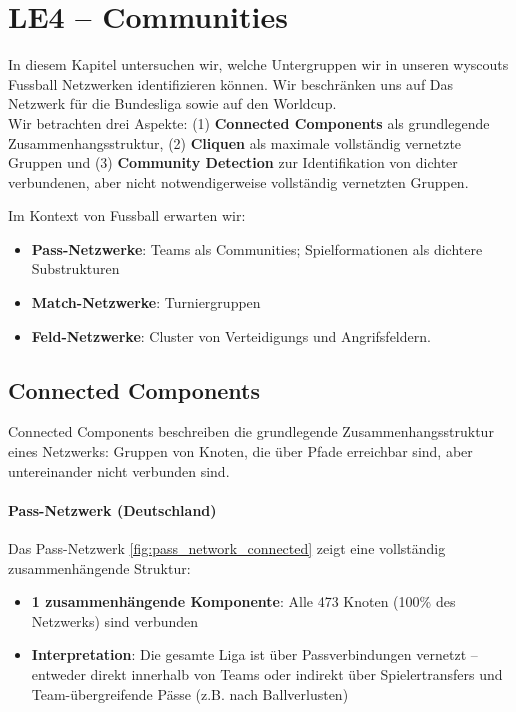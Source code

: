 \section{LE4 -- Communities}

In diesem Kapitel untersuchen wir, welche Untergruppen wir in unseren wyscouts Fussball Netzwerken identifizieren können. Wir beschränken uns auf Das Netzwerk für die Bundesliga sowie auf den Worldcup.\\
Wir betrachten drei Aspekte: (1) \textbf{Connected Components} als grundlegende Zusammenhangsstruktur, (2) \textbf{Cliquen} als maximale vollständig vernetzte Gruppen und (3) \textbf{Community Detection} zur Identifikation von dichter verbundenen, aber nicht notwendigerweise vollständig vernetzten Gruppen.

Im Kontext von Fussball erwarten wir:
\begin{itemize}
  \item \textbf{Pass-Netzwerke}: Teams als Communities; Spielformationen als dichtere Substrukturen
  \item \textbf{Match-Netzwerke}: Turniergruppen
  \item \textbf{Feld-Netzwerke}: Cluster von Verteidigungs und Angrifsfeldern.
\end{itemize}

\subsection{Connected Components}

Connected Components beschreiben die grundlegende Zusammenhangsstruktur eines Netzwerks: Gruppen von Knoten, die über Pfade erreichbar sind, aber untereinander nicht verbunden sind.

\paragraph{Pass-Netzwerk (Deutschland)}
Das Pass-Netzwerk \ref{fig:pass_network_connected} zeigt eine vollständig zusammenhängende Struktur:
\begin{itemize}
  \item \textbf{1 zusammenhängende Komponente}: Alle 473 Knoten (100\% des Netzwerks) sind verbunden
  \item \textbf{Interpretation}: Die gesamte Liga ist über Passverbindungen vernetzt -- entweder direkt innerhalb von Teams oder indirekt über Spielertransfers und Team-übergreifende Pässe (z.B. nach Ballverlusten)
\end{itemize}

